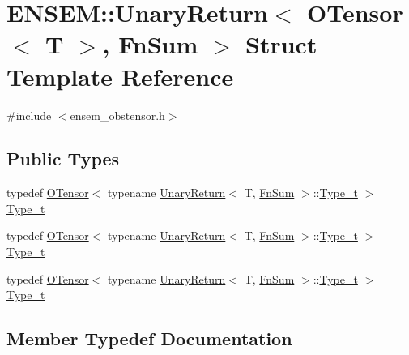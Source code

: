 \hypertarget{structENSEM_1_1UnaryReturn_3_01OTensor_3_01T_01_4_00_01FnSum_01_4}{}\section{E\+N\+S\+EM\+:\+:Unary\+Return$<$ O\+Tensor$<$ T $>$, Fn\+Sum $>$ Struct Template Reference}
\label{structENSEM_1_1UnaryReturn_3_01OTensor_3_01T_01_4_00_01FnSum_01_4}


{\ttfamily \#include $<$ensem\+\_\+obstensor.\+h$>$}

\subsection*{Public Types}
\begin{DoxyCompactItemize}
\item 
typedef \mbox{\hyperlink{classENSEM_1_1OTensor}{O\+Tensor}}$<$ typename \mbox{\hyperlink{structENSEM_1_1UnaryReturn}{Unary\+Return}}$<$ T, \mbox{\hyperlink{structENSEM_1_1FnSum}{Fn\+Sum}} $>$\+::\mbox{\hyperlink{structENSEM_1_1UnaryReturn_3_01OTensor_3_01T_01_4_00_01FnSum_01_4_a97a77020ae2f9a17419c0a6b9c45b5b9}{Type\+\_\+t}} $>$ \mbox{\hyperlink{structENSEM_1_1UnaryReturn_3_01OTensor_3_01T_01_4_00_01FnSum_01_4_a97a77020ae2f9a17419c0a6b9c45b5b9}{Type\+\_\+t}}
\item 
typedef \mbox{\hyperlink{classENSEM_1_1OTensor}{O\+Tensor}}$<$ typename \mbox{\hyperlink{structENSEM_1_1UnaryReturn}{Unary\+Return}}$<$ T, \mbox{\hyperlink{structENSEM_1_1FnSum}{Fn\+Sum}} $>$\+::\mbox{\hyperlink{structENSEM_1_1UnaryReturn_3_01OTensor_3_01T_01_4_00_01FnSum_01_4_a97a77020ae2f9a17419c0a6b9c45b5b9}{Type\+\_\+t}} $>$ \mbox{\hyperlink{structENSEM_1_1UnaryReturn_3_01OTensor_3_01T_01_4_00_01FnSum_01_4_a97a77020ae2f9a17419c0a6b9c45b5b9}{Type\+\_\+t}}
\item 
typedef \mbox{\hyperlink{classENSEM_1_1OTensor}{O\+Tensor}}$<$ typename \mbox{\hyperlink{structENSEM_1_1UnaryReturn}{Unary\+Return}}$<$ T, \mbox{\hyperlink{structENSEM_1_1FnSum}{Fn\+Sum}} $>$\+::\mbox{\hyperlink{structENSEM_1_1UnaryReturn_3_01OTensor_3_01T_01_4_00_01FnSum_01_4_a97a77020ae2f9a17419c0a6b9c45b5b9}{Type\+\_\+t}} $>$ \mbox{\hyperlink{structENSEM_1_1UnaryReturn_3_01OTensor_3_01T_01_4_00_01FnSum_01_4_a97a77020ae2f9a17419c0a6b9c45b5b9}{Type\+\_\+t}}
\end{DoxyCompactItemize}


\subsection{Member Typedef Documentation}
\mbox{\label{structENSEM_1_1UnaryReturn_3_01OTensor_3_01T_01_4_00_01FnSum_01_4_a97a77020ae2f9a17419c0a6b9c45b5b9}} 
